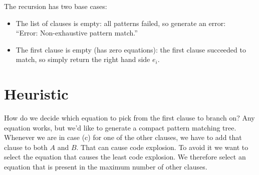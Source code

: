 \documentclass[a4paper, 11pt]{article}
\theoremstyle{definition}
\begin{document}
\medskip

\noindent The recursion has two base cases:
\begin{itemize}
  \item The list of clauses is empty: all patterns failed, so generate an error:\\ ``Error: Non-exhaustive pattern match.''
  \item The first clause is empty (has zero equations): the first clause succeeded to match, so simply return the right hand side $e_i$.
\end{itemize}

\section{Heuristic}

How do we decide which equation to pick from the first clause to branch on? Any equation works, but we'd like to generate a compact pattern matching tree. Whenever we are in case (c) for one of the other clauses, we have to add that clause to both $A$ and $B$. That can cause code explosion. To avoid it we want to select the equation that causes the least code explosion. We therefore select an equation that is present in the maximum number of other clauses.
\end{document}
